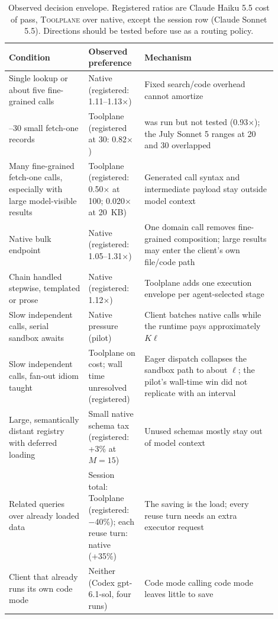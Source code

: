 \documentclass[10pt,twocolumn]{article}
\newcommand{\toolplane}{\textsc{Toolplane}\xspace}
\begin{document}
\begin{table}[t]
\centering
\small
\caption{Observed decision envelope.  Registered ratios are Claude Haiku 5.5
cost of pass, \toolplane over native, except the session row (Claude Sonnet
5.5).  Directions should be tested before use as a routing policy.}
\label{tab:decision}
\begin{tabular}{>{\raggedright\arraybackslash}p{0.27\linewidth}>{\raggedright\arraybackslash}p{0.18\linewidth}>{\raggedright\arraybackslash}p{0.45\linewidth}}
\toprule
Condition & Observed preference & Mechanism \\
\midrule
Single lookup or about five fine-grained calls & Native (registered:
1.11--1.13$\times$) & Fixed search/code overhead cannot amortize \\
20--30 small fetch-one records & Toolplane (registered at 30:
0.82$\times$) & 20 was run but not tested (0.93$\times$); the July Sonnet 5
ranges at 20 and 30 overlapped \\
Many fine-grained fetch-one calls, especially with large model-visible results
& Toolplane (registered: 0.50$\times$ at 100; 0.020$\times$ at 20~KB) &
Generated call syntax and intermediate payload stay outside model context \\
Native bulk endpoint & Native (registered: 1.05--1.31$\times$) & One domain
call removes fine-grained composition; large results may enter the client's own
file/code path \\
Chain handled stepwise, templated or prose & Native (registered: 1.12$\times$)
& Toolplane adds one execution envelope per agent-selected stage \\
Slow independent calls, serial sandbox awaits & Native pressure (pilot) &
Client batches native calls while the runtime pays approximately $K\ell$ \\
Slow independent calls, fan-out idiom taught & Toolplane on cost; wall time
unresolved (registered) & Eager dispatch collapses the sandbox path to about
$\ell$; the pilot's wall-time win did not replicate with an interval \\
Large, semantically distant registry with deferred loading & Small native
schema tax (registered: +3\% at $M=15$) & Unused schemas mostly stay out of
model context \\
Related queries over already loaded data & Session total: Toolplane
(registered: $-$40\%); each reuse turn: native (+35\%) & The saving is the
load; every reuse turn needs an extra executor request \\
Client that already runs its own code mode & Neither (Codex gpt-6.1-sol, four
runs) & Code mode calling code mode leaves little to save \\
\bottomrule
\end{tabular}
\end{table}
\end{document}
